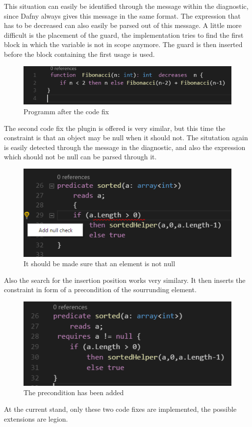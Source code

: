 This situation can easily be identified through the message within the diagnostic, since Dafny always gives this message in the same format. The expression that has to be decreased can also easily be parsed out of this message. A little more difficult is the placement of the guard, the implementation tries to find the first block in which the variable is not in scope anymore. The guard is then inserted before the block containing the first usage is used. \newline
  \begin{figure}[H]
	\centering
	\includegraphics[width=1\textwidth]{img/decreaseGuardApplied}
	\caption{Programm after the code fix}
	\label{fig:decreaseguardapplied}
\end{figure}
The second code fix the plugin is offered is very similar, but this time the constraint is that an object may be null when it should not. The situtation again is easily detected through the message in the diagnostic, and also the expression which should not be null can be parsed through it.
  \begin{figure}[H]
	\centering
	\includegraphics[width=1\textwidth]{img/nullCheck}
	\caption{It should be made sure that an element is not null}
	\label{fig:nullcheck}
\end{figure}
Also the search for the insertion position works very similary. It then inserts the constraint in form of a precondition of the sourrunding element. \newline
  \begin{figure}[H]
	\centering
	\includegraphics[width=1\textwidth]{img/nullCheckApplied}
	\caption{The precondition has been added}
	\label{fig:nullcheckapplied}
\end{figure}
At the current stand, only these two code fixes are implemented, the possible extensions are legion. 
